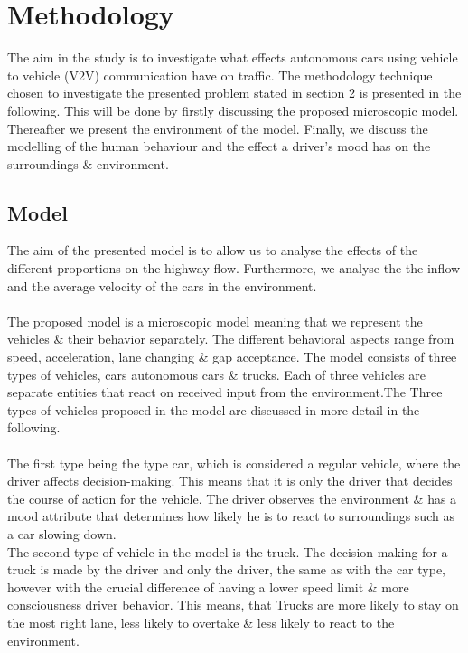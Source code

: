 \section{Methodology}
\label{sec:section3}
 
The aim in the study is to investigate what effects autonomous cars using vehicle to vehicle (V2V) communication have on traffic. The methodology technique chosen to investigate the presented problem stated in \hyperref[sec:problem-statement]{section 2} is presented in the following. This will be done by firstly discussing the proposed microscopic model. Thereafter we present the environment of the model. Finally, we discuss the modelling of the human behaviour and the effect a driver's mood has on the surroundings \& environment. 
\subsection{Model}
The aim of the presented model is to allow us to analyse the effects of the different proportions on the highway flow.  Furthermore, we analyse the the inflow and the average velocity of the cars in the environment. \\
\\
The proposed model is a microscopic model meaning that we represent the vehicles \& their behavior separately. The different  behavioral aspects range from speed, acceleration, lane changing \& gap acceptance. 
The model consists of three types of vehicles, cars autonomous cars \& trucks. Each of three vehicles are separate entities that react on received input from the environment.The Three types of vehicles proposed in the model are discussed in more detail in the following. \\ 
\\ 
The first type being the type car, which is considered a regular vehicle, where the driver affects decision-making. This means that it is only the driver that decides the course of action for the vehicle. The driver observes the environment \& has a mood attribute that determines how likely he is to react to surroundings such as a car slowing down. \\
The second type of vehicle in the model is the truck. The decision making for a truck is made by the driver and only the driver, the same as with the car type, however with the crucial difference of having a lower speed limit \& more consciousness driver behavior. This means, that Trucks are more likely to stay on the most right lane, less likely to overtake \& less likely to react to the environment. \\
